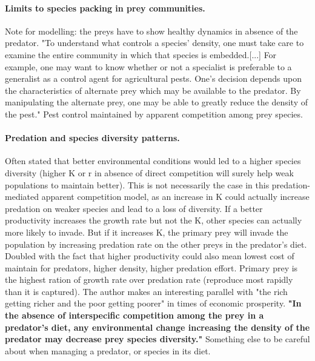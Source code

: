 \documentclass[12pt,a4paper]{article}
\begin{document}
\paragraph{Limits to species packing in prey communities.} Note for modelling: the preys have to show healthy dynamics in absence of the predator. "To understand what controls a species’ density, one must take care to examine the entire community in which that species is embedded.[...] For example, one may want to know whether or not a specialist is preferable to a generalist as a control agent for agricultural pests. One’s decision depends upon the characteristics of alternate prey which may be available to the predator. By manipulating the alternate prey, one may be able to greatly reduce the density of the pest." Pest control maintained by apparent competition among prey species.

\paragraph{Predation and species diversity patterns.} Often stated that better environmental conditions would led to a higher species diversity (higher K or r in absence of direct competition will surely help weak populations to maintain better). This is not necessarily the case in this predation-mediated apparent competition model, as an increase in K could actually increase predation on weaker species and lead to a loss of diversity. If a better productivity increases the growth rate but not the K, other species can actually more likely to invade. But if it increases K, the primary prey will invade the population by increasing predation rate on the other preys in the predator's diet. Doubled with the fact that higher productivity could also mean lowest cost of maintain for predators, higher density, higher predation effort. Primary prey is the highest ration of growth rate over predation rate (reproduce most rapidly than it is captured). The author makes an interesting parallel with "the rich getting richer and the poor getting poorer" in times of economic prosperity. \textbf{"In the absence of interspecific competition among the prey in a predator’s diet, any environmental change increasing the density of the predator may decrease prey species diversity."} Something else to be careful about when managing a predator, or species in its diet.
\end{document}
